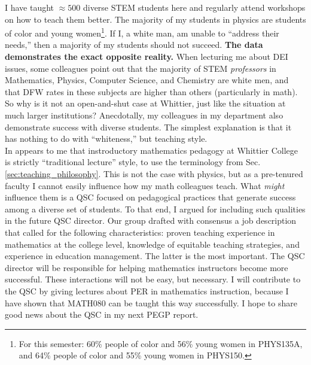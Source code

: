 \documentclass[../../../main.tex]{subfiles}
\begin{document}
I have taught $\approx 500$ diverse STEM students here and regularly attend workshops on how to teach them better.  The majority of my students in physics are students of color and young women\footnote{For this semester: 60\% people of color and 56\% young women in PHYS135A, and 64\% people of color and 55\% young women in PHYS150.}.  If I, a white man, am unable to ``address their needs,'' then a majority of my students should not succeed.  \textbf{The data demonstrates the exact opposite reality.}  When lecturing me about DEI issues, some colleagues point out that the majority of STEM \textit{professors} in Mathematics, Physics, Computer Science, and Chemistry are white men, and that DFW rates in these subjects are higher than others (particularly in math).  So why is it not an open-and-shut case at Whittier, just like the situation at much larger institutions?  Anecdotally, my colleagues in my department also demonstrate success with diverse students.  The simplest explanation is that it has nothing to do with ``whiteness,'' but teaching style.
\\
\vspace{0.25cm}
In appears to me that instroductory mathematics pedagogy at Whittier College is strictly ``traditional lecture'' style, to use the terminology from Sec. \ref{sec:teaching_philosophy}.  This is not the case with physics, but as a pre-tenured faculty I cannot easily influence how my math colleagues teach.  What \textit{might} influence them is a QSC focused on pedagogical practices that generate success among a diverse set of students.  To that end, I argued for including such qualities in the future QSC director.  Our group drafted with consensus a job description that called for the following characteristics: proven teaching experience in mathematics at the college level, knowledge of equitable teaching strategies, and experience in education management.  The latter is the most important.  The QSC director will be responsible for helping mathematics instructors become more successful.  These interactions will not be easy, but necessary.  I will contribute to the QSC by giving lectures about PER in mathematics instruction, because I have shown that MATH080 can be taught this way successfully.  I hope to share good news about the QSC in my next PEGP report.
\end{document}
